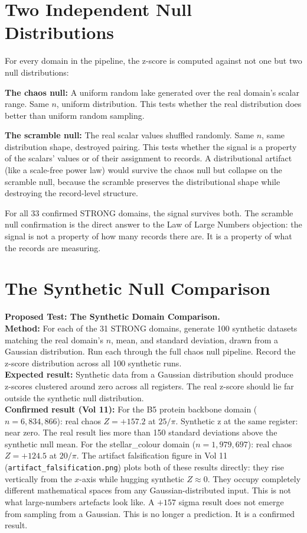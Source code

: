 \documentclass[11pt, letterpaper, openany]{book}
\begin{document}
\section{Two Independent Null Distributions}

For every domain in the pipeline, the z-score is computed
against not one but two null distributions:

\textbf{The chaos null:} A uniform random lake generated over
the real domain's scalar range. Same $n$, uniform distribution.
This tests whether the real distribution does better than
uniform random sampling.

\textbf{The scramble null:} The real scalar values shuffled
randomly. Same $n$, same distribution shape, destroyed pairing.
This tests whether the signal is a property of the scalars'
values or of their assignment to records. A distributional
artifact (like a scale-free power law) would survive the
chaos null but collapse on the scramble null, because
the scramble preserves the distributional shape while
destroying the record-level structure.

For all 33 confirmed STRONG domains, the signal survives both.
The scramble null confirmation is the direct answer to the
Law of Large Numbers objection: the signal is not a property
of how many records there are. It is a property of what
the records are measuring.

\section{The Synthetic Null Comparison}

\begin{predictionbox}
\textbf{Proposed Test: The Synthetic Domain Comparison.}\\[0.5em]
\textbf{Method:} For each of the 31 STRONG domains, generate 100
synthetic datasets matching the real domain's $n$, mean, and standard
deviation, drawn from a Gaussian distribution. Run each through the
full chaos null pipeline. Record the z-score distribution across all
100 synthetic runs.\\[0.5em]
\textbf{Expected result:} Synthetic data from a Gaussian distribution
should produce z-scores clustered around zero across all registers.
The real z-score should lie far outside the synthetic null distribution.\\[0.5em]
\textbf{Confirmed result (Vol 11):} For the B5 protein backbone domain
($n = 6{,}834{,}866$): real chaos $Z = +157.2$ at $25/\pi$. Synthetic
z at the same register: near zero. The real result lies more than
150 standard deviations above the synthetic null mean. For the
stellar\_colour domain ($n = 1{,}979{,}697$): real chaos $Z = +124.5$
at $20/\pi$. The artifact falsification figure in Vol 11
(\texttt{artifact\_falsification.png}) plots both of these results
directly: they rise vertically from the $x$-axis while hugging
synthetic $Z \approx 0$. They occupy completely different mathematical
spaces from any Gaussian-distributed input. This is not what
large-numbers artefacts look like. A $+157$ sigma result does not
emerge from sampling from a Gaussian. This is no longer a prediction.
It is a confirmed result.
\end{predictionbox}
\end{document}
